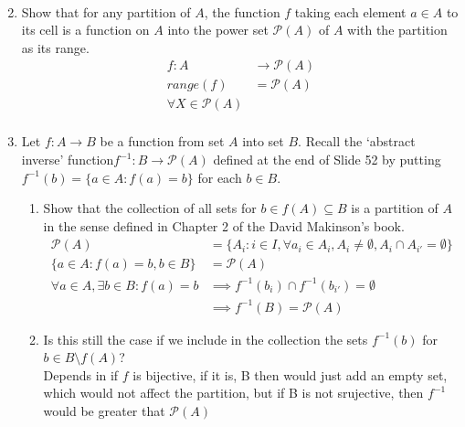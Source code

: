\documentclass{article}
\begin{document}
\begin{enumerate}
\begin{align*}
    \end{align*}
    \item Show that for any partition of $A$, the function $f$ taking each element $a \in A$ to its cell is a function on $A$ into the power set $\mathscr{P}(A)$ of $A$ with the partition as its range.
    \begin{align*}
        f: A &\rightarrow \mathscr{P}(A)\\
        range(f) &= \mathcal{P}(A)\\
        \forall X \in \mathcal{P}(A)\\
    \end{align*}
    \item Let $f: A \rightarrow B$ be a function from set $A$ into set $B$. Recall the ‘abstract inverse’ function$f^{-1}: B \rightarrow \mathcal{P}(A)$ defined at the end of Slide 52 by putting $f^{-1}(b) = \{a \in A: f(a) = b\}$ for each $b \in B$.
    \begin{enumerate}
        \item Show that the collection of all sets for $b \in f(A) \subseteq B$ is a partition of $A$ in the sense defined in Chapter 2 of the David Makinson’s book.
        \begin{align*}
            \mathcal{P}(A) &= \{ A_{i}: i \in I, \forall a_{i} \in A_{i}, A_{i} \neq \emptyset, A_{i} \cap A_{i'} = \emptyset \}\\
            \{a \in A: f(a) = b, b \in B\} &= \mathcal{P}(A)\\
            \forall a \in A, \exists b \in B : f(a) = b &\implies f^{-1}(b_{i}) \cap f^{-1}(b_{i'}) = \emptyset\\
            &\implies f^{-1}(B) = \mathcal{P}(A)
        \end{align*}
        \item Is this still the case if we include in the collection the sets $f^{-1}(b)$ for $b \in B \setminus f(A)$?\\
        Depends in if $f$ is bijective, if it is, B then would just add an empty set, which would not affect the partition, but if B is not srujective, then $f^{-1}$ would be greater that $\mathcal{P}(A)$
    \end{enumerate}
\end{enumerate}
\end{document}
